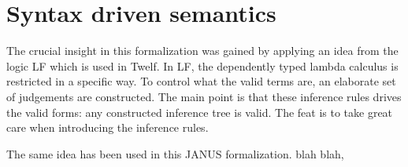 \chapter{Syntax driven semantics}


The crucial insight in this formalization was gained by applying an
idea from the logic LF which is used in Twelf. In LF, the dependently
typed lambda calculus is restricted in a specific way. To control what
the valid terms are, an elaborate set of judgements are
constructed. The main point is that these inference rules drives the
valid forms: any constructed inference tree is valid. The feat is to
take great care when introducing the inference rules.

The same idea has been used in this JANUS formalization. blah blah,

